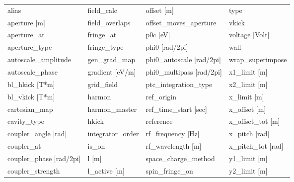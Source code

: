  \begin{tabular}{llll} \toprule
alias                            & field_calc                       & offset [m]                       & type                             \\
aperture [m]                     & field_overlaps                   & offset_moves_aperture            & vkick                            \\
aperture_at                      & fringe_at                        & p0c [eV]                         & voltage [Volt]                   \\
aperture_type                    & fringe_type                      & phi0 [rad/2pi]                   & wall                             \\
autoscale_amplitude              & gen_grad_map                     & phi0_autoscale [rad/2pi]         & wrap_superimpose                 \\
autoscale_phase                  & gradient [eV/m]                  & phi0_multipass [rad/2pi]         & x1_limit [m]                     \\
bl_hkick [T*m]                   & grid_field                       & ptc_integration_type             & x2_limit [m]                     \\
bl_vkick [T*m]                   & harmon                           & ref_origin                       & x_limit [m]                      \\
cartesian_map                    & harmon_master                    & ref_time_start [sec]             & x_offset [m]                     \\
cavity_type                      & hkick                            & reference                        & x_offset_tot [m]                 \\
coupler_angle [rad]              & integrator_order                 & rf_frequency [Hz]                & x_pitch [rad]                    \\
coupler_at                       & is_on                            & rf_wavelength [m]                & x_pitch_tot [rad]                \\
coupler_phase [rad/2pi]          & l [m]                            & space_charge_method              & y1_limit [m]                     \\
coupler_strength                 & l_active [m]                     & spin_fringe_on                   & y2_limit [m]                     \\

\end{tabular}
